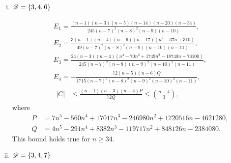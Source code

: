 \documentclass{amsart}
\begin{document}
{\begin{enumerate}[(i)]
\begin{gather*}
E_1=\frac{(n-2)(n-3)(n-6)\left(n^4-66n^3+1745n^2-20448n+87840\right)}{1225(n-7)^2(n-8)^2(n-9)^2(n-10)},\\ E_2=\frac{3(n-2)(n-4)\left(n^4-68n^3+1669n^2-17642n+68160\right)}{245(n-7)(n-8)^2(n-9)^2(n-10)(n-11)},\\ 
E_3=\frac{8(n-3)(n-4)\left(3n^4-160n^3+3222n^2-28895n+97050\right)}{245(n-7)^2(n-8)(n-9)^2(n-10)^2(n-11)},\\
E_4=-\frac{8(n-6)Q}{1715(n-7)^2(n-8)^2(n-9)^3(n-10)^2(n-11)},\\
\begin{aligned}
|C| &\le \frac{(n-2)(n-3)(n-4)P}{40Q}
\leq \binom{n-4}{3},
\end{aligned}
\end{gather*}
where
\begin{align*}
P &= 7n^6-539n^5+17507n^4-302361n^3+2903826n^2-14643760n +30251400,\\
Q &= 5n^6-375n^5+11786n^4-198771n^3+1896155 n^2-9689568n+20692440.
\end{align*}
This bound holds true for $n\ge 27.$

\item $\mathscr{D}=\{3,4,6\}$

\begin{gather*}
E_1=\frac{(n-1)(n-3)(n-5)(n-14)(n-20)(n-34)}{245(n-7)^2(n-8)^2(n-9)(n-10)},\\ 
E_2=\frac{3(n-1)(n-4)(n-6)(n-17)\left(n^2-37n+310\right)}{49(n-7)^2(n-8)^2(n-9)(n-10)(n-11)},\\ 
E_3=\frac{24(n-3)(n-4)\left(n^4-70n^3+1749n^2-18740n+73100\right)}{245(n-7)^2(n-8)(n-9)^2(n-10)^2(n-11)},\\
E_4=-\frac{72(n-5)(n-6)Q}{1715(n-7)^3(n-8)^2(n-9)^2(n-10)^2(n-11)},\\
\begin{aligned}
|C| &\le \frac{(n-1)(n-3)(n-4)P}{72Q}
\leq \binom{n-4}{3},
\end{aligned}
\end{gather*}
where
\begin{align*}
P &= 7n^5-560n^4+17017n^3-246980n^2+1720516n-4621280,\\
Q &= 4n^5-291n^4+8382n^3-119717n^2+848126n-2384080.
\end{align*}
This bound holds true for $n\ge 34.$

\item $\mathscr{D}=\{3,4,7\}$


\end{enumerate}}
\end{document}
